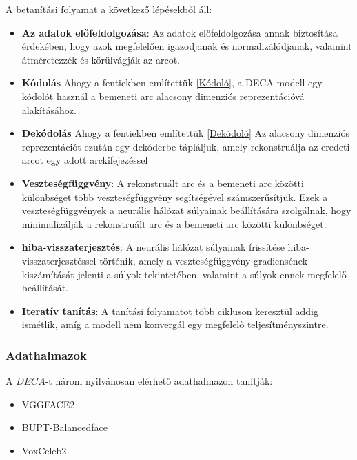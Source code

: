 \documentclass[12pt,a4]{article}
\begin{document}
                A betanítási folyamat a következő lépésekből áll:
                    \begin{itemize}
                        \item \textbf{Az adatok előfeldolgozása}: Az adatok előfeldolgozása annak biztosítása érdekében, hogy azok megfelelően igazodjanak és normalizálódjanak, valamint átméretezzék és körülvágják az arcot.
    
                        \item \textbf{Kódolás} Ahogy a fentiekben említettük \ref{Kódoló}, a DECA modell egy kódolót használ a bemeneti arc alacsony dimenziós reprezentációvá alakításához. 
    
                        \item \textbf{Dekódolás} Ahogy a fentiekben említettük \ref{Dekódoló} Az alacsony dimenziós reprezentációt ezután egy dekóderbe tápláljuk, amely rekonstruálja az eredeti arcot egy adott arckifejezéssel
    
                        \item \textbf{Veszteségfüggvény}: A rekonstruált arc és a bemeneti arc közötti különbséget több veszteségfüggvény segítségével számszerűsítjük. Ezek a veszteségfüggvények a neurális hálózat súlyainak beállítására szolgálnak, hogy minimalizálják a rekonstruált arc és a bemeneti arc közötti különbséget.
    
                        \item \textbf{hiba-visszaterjesztés}: A neurális hálózat súlyainak frissítése hiba-visszaterjesztéssel történik, amely a veszteségfüggvény gradiensének kiszámítását jelenti a súlyok tekintetében, valamint a súlyok ennek megfelelő beállítását.
    
                        \item \textbf{Iteratív tanítás}: A tanítási folyamatot több cikluson keresztül addig ismétlik, amíg a modell nem konvergál egy megfelelő teljesítményszintre.
                    \end{itemize}
                
            \subsubsection{Adathalmazok}
                A $DECA$-t három nyilvánosan elérhető adathalmazon tanítják:
     	              \begin{itemize}
     	            	\item VGGFACE2
     	            	\item BUPT-Balancedface
     	            	\item VoxCeleb2
     	              \end{itemize}
    
\end{document}
